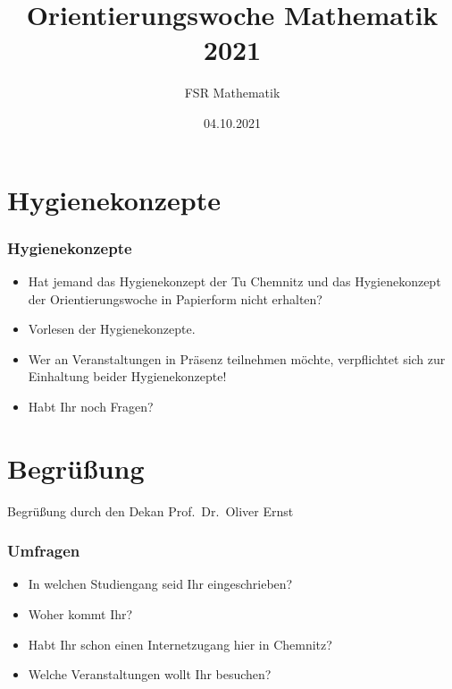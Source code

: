 \documentclass[10pt]{beamer}
\title[Orientierungswoche Mathematik 2021]{Orientierungswoche Mathematik 2021}
\author{FSR Mathematik}
\date{04.10.2021}
\institute[]{TU Chemnitz}
\makeatletter
\newcommand{\highl}[1]{\color{tuccolor@ma}#1\color{black}}
\makeatother
\begin{document}
\begingroup

\tucthreeheadlines


\endgroup

\tuctwoheadlines

\section{Hygienekonzepte}

\begin{frame}
	\frametitle{Hygienekonzepte}
	\begin{itemize}
		\item Hat jemand das Hygienekonzept der Tu Chemnitz und das Hygienekonzept der Orientierungswoche in Papierform nicht erhalten?
		\item Vorlesen der Hygienekonzepte.
		\item Wer an Veranstaltungen in Präsenz teilnehmen möchte, verpflichtet sich zur Einhaltung beider Hygienekonzepte!
		\item Habt Ihr noch Fragen?
	\end{itemize}
\end{frame}


\section{Begrüßung}

\begin{frame}
	\begin{center}
		\Huge{\highl{Begrüßung durch den Dekan Prof.~Dr.~Oliver Ernst}}
	\end{center}
\end{frame}

\begin{frame}
	\frametitle{Umfragen}
	\begin{itemize}
		\item In welchen Studiengang seid Ihr eingeschrieben?
		\item Woher kommt Ihr?
		\item Habt Ihr schon einen Internetzugang hier in Chemnitz?
		\item Welche Veranstaltungen wollt Ihr besuchen?
	\end{itemize}
\end{frame}
\end{document}
